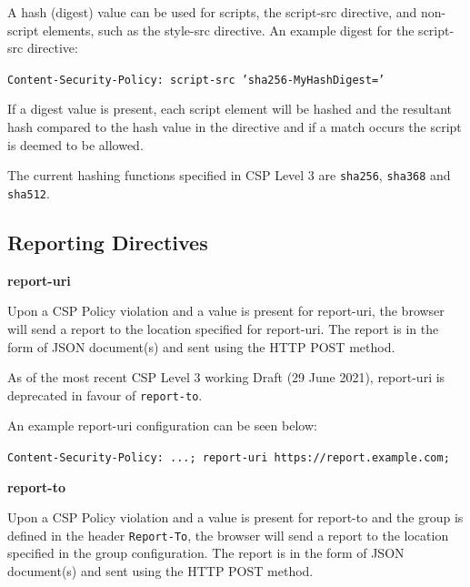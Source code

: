 \documentclass{mscreport}
\begin{document}
\vspace{0.3cm} \noindent
A hash (digest) value can be used for scripts, the script-src directive, and non-script elements, such as the style-src directive. An example digest for the script-src directive:

\vspace{0.3cm} \noindent
\texttt{Content-Security-Policy: script-src 'sha256-MyHashDigest='}

\vspace{0.3cm} \noindent
If a digest value is present, each script element will be hashed and the resultant hash compared to the hash value in the directive and if a match occurs the script is deemed to be allowed.

\vspace{0.3cm} \noindent
The current hashing functions specified in CSP Level 3 are \texttt{sha256}, \texttt{sha368} and \texttt{sha512}.

\subsection{Reporting Directives}

\textbf{report-uri}

\vspace{0.3cm} \noindent
Upon a CSP Policy violation and a value is present for report-uri, the browser will send a report to the location specified for report-uri. The report is in the form of JSON document(s) and sent using the HTTP POST method.

\vspace{0.3cm} \noindent
As of the most recent CSP Level 3 working Draft (29 June 2021), report-uri is deprecated in favour of \texttt{report-to}.

\vspace{0.3cm} \noindent
An example report-uri configuration can be seen below:

\vspace{0.3cm} \noindent
\texttt{Content-Security-Policy: ...; report-uri https://report.example.com;}

\vspace{0.7cm} \noindent
\textbf{report-to}

\vspace{0.3cm} \noindent
Upon a CSP Policy violation and a value is present for report-to and the group is defined in the header \texttt{Report-To}, the browser will send a report to the location specified in the group configuration. The report is in the form of JSON document(s) and sent using the HTTP POST method.
\end{document}
